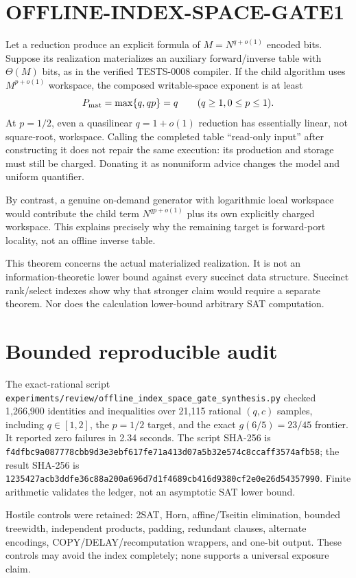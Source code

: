 \documentclass[11pt]{article}
\begin{document}
\section{OFFLINE-INDEX-SPACE-GATE1}

Let a reduction produce an explicit formula of $M=N^{q+o(1)}$ encoded bits.
Suppose its realization materializes an auxiliary forward/inverse table with
$\Theta(M)$ bits, as in the verified TESTS-0008 compiler.  If the child
algorithm uses $M^{p+o(1)}$ workspace, the composed writable-space exponent
is at least
\[
P_{\rm mat}=\max\{q,qp\}=q\qquad(q\ge1, 0\le p\le1).
\]
At $p=1/2$, even a quasilinear $q=1+o(1)$ reduction has essentially linear,
not square-root, workspace.  Calling the completed table ``read-only input''
after constructing it does not repair the same execution: its production and
storage must still be charged.  Donating it as nonuniform advice changes the
model and uniform quantifier.

By contrast, a genuine on-demand generator with logarithmic local workspace
would contribute the child term $N^{qp+o(1)}$ plus its own explicitly charged
workspace.  This explains precisely why the remaining target is forward-port
locality, not an offline inverse table.

This theorem concerns the actual materialized realization.  It is not an
information-theoretic lower bound against every succinct data structure.
Succinct rank/select indexes show why that stronger claim would require a
separate theorem.  Nor does the calculation lower-bound arbitrary SAT
computation.

\section{Bounded reproducible audit}

The exact-rational script
\texttt{experiments/review/offline\_index\_space\_gate\_synthesis.py}
checked 1,266,900 identities and inequalities over 21,115 rational
$(q,c)$ samples, including $q\in[1,2]$, the $p=1/2$ target, and the exact
$g(6/5)=23/45$ frontier.  It reported zero failures in 2.34 seconds.
The script SHA-256 is
\texttt{f4dfbc9a087778cbb9d3e3ebf617fe71a413d07a5b32e574c8ccaff3574afb58};
the result SHA-256 is
\texttt{1235427acb3ddfe36c88a200a696d7d1f4689cb416d9380cf2e0e26d54357990}.
Finite arithmetic validates the ledger, not an asymptotic SAT lower bound.

Hostile controls were retained: 2SAT, Horn, affine/Tseitin elimination,
bounded treewidth, independent products, padding, redundant clauses,
alternate encodings, COPY/DELAY/recomputation wrappers, and one-bit output.
These controls may avoid the index completely; none supports a universal
exposure claim.
\end{document}
